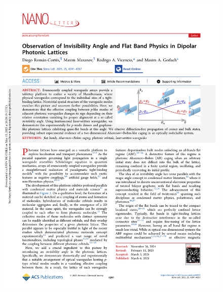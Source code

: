 \begin{figure}[H]
	\centering
	\includegraphics[page=1, width=\linewidth]{media/dipolepap.pdf}
\end{figure}
\newpage
